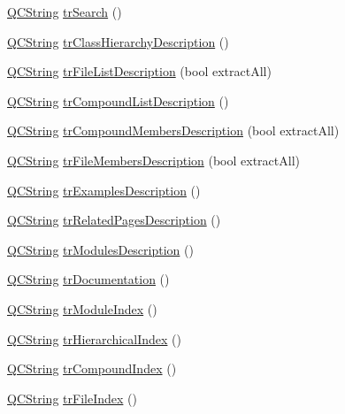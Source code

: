 \begin{DoxyCompactItemize}
\hyperlink{class_q_c_string}{Q\-C\-String} \hyperlink{class_translator_italian_a2f2c099d338acd273fcee72f364cb0bf}{tr\-Search} ()
\item 
\hyperlink{class_q_c_string}{Q\-C\-String} \hyperlink{class_translator_italian_af186dceea08383c80ad071e6e3f543ba}{tr\-Class\-Hierarchy\-Description} ()
\item 
\hyperlink{class_q_c_string}{Q\-C\-String} \hyperlink{class_translator_italian_a06622611a5482a239a3ceb1c3fad6fce}{tr\-File\-List\-Description} (bool extract\-All)
\item 
\hyperlink{class_q_c_string}{Q\-C\-String} \hyperlink{class_translator_italian_a18f7b164eb6009520c23d8af21d01567}{tr\-Compound\-List\-Description} ()
\item 
\hyperlink{class_q_c_string}{Q\-C\-String} \hyperlink{class_translator_italian_afba045a538c6b4cff7756d4435702631}{tr\-Compound\-Members\-Description} (bool extract\-All)
\item 
\hyperlink{class_q_c_string}{Q\-C\-String} \hyperlink{class_translator_italian_ad17c74cbe2208cab62912d3f2e99c351}{tr\-File\-Members\-Description} (bool extract\-All)
\item 
\hyperlink{class_q_c_string}{Q\-C\-String} \hyperlink{class_translator_italian_a11dd83f87e1d6ba0a6c2ef418d9ccb11}{tr\-Examples\-Description} ()
\item 
\hyperlink{class_q_c_string}{Q\-C\-String} \hyperlink{class_translator_italian_a4e97a46b23f0e534aa73cf4c02aebe3c}{tr\-Related\-Pages\-Description} ()
\item 
\hyperlink{class_q_c_string}{Q\-C\-String} \hyperlink{class_translator_italian_a5cc376e4e57f8791fa6b95f8275b5ed6}{tr\-Modules\-Description} ()
\item 
\hyperlink{class_q_c_string}{Q\-C\-String} \hyperlink{class_translator_italian_aae6547fd48c2b7a62503ef2466977c6f}{tr\-Documentation} ()
\item 
\hyperlink{class_q_c_string}{Q\-C\-String} \hyperlink{class_translator_italian_a632bc39ac817c83b74c16e63d375979b}{tr\-Module\-Index} ()
\item 
\hyperlink{class_q_c_string}{Q\-C\-String} \hyperlink{class_translator_italian_a0e0aeba35a42bb63680e044cf8c48310}{tr\-Hierarchical\-Index} ()
\item 
\hyperlink{class_q_c_string}{Q\-C\-String} \hyperlink{class_translator_italian_a0e48e1a405822c874fe32a4de9360476}{tr\-Compound\-Index} ()
\item 
\hyperlink{class_q_c_string}{Q\-C\-String} \hyperlink{class_translator_italian_a15f2669159c8adbd33de270cb9612882}{tr\-File\-Index} ()

\end{DoxyCompactItemize}
